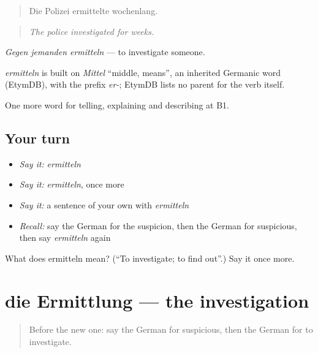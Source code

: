 \begin{quote}
Die Polizei ermittelte wochenlang.
\end{quote}

\begin{quote}
\emph{The police investigated for weeks.}
\end{quote}

\emph{Gegen jemanden ermitteln} — to investigate someone.

\begin{cousinweb}
\emph{ermitteln} is built on \emph{Mittel} \textquotedblleft{}middle, means\textquotedblright{}, an inherited Germanic word (EtymDB), with the prefix \emph{er-}; EtymDB lists no parent for the verb itself.
\end{cousinweb}

\begin{grammarlens}[title={What you've built}]
One more word for telling, explaining and describing at B1.
\end{grammarlens}

\subsection*{Your turn}
\begin{itemize}
\raggedright
  \item \emph{Say it:} \emph{ermitteln}
  \item \emph{Say it:} \emph{ermitteln}, once more
  \item \emph{Say it:} a sentence of your own with \emph{ermitteln}
  \item \emph{Recall:} say the German for the suspicion, then the German for suspicious, then say \emph{ermitteln} again
\end{itemize}

\begin{tcolorbox}[breakable,colback=teal!4,colframe=teal!35!black,title={Before you move on}]
What does ermitteln mean? (\textquotedblleft{}To investigate; to find out\textquotedblright{}.) Say it once more.
\end{tcolorbox}
\section[die Ermittlung]{die Ermittlung — the investigation}

\label{lesson:GE-C284-ermittlung}



\begin{quote}
Before the new one: say the German for suspicious, then the German for to investigate.
\end{quote}

